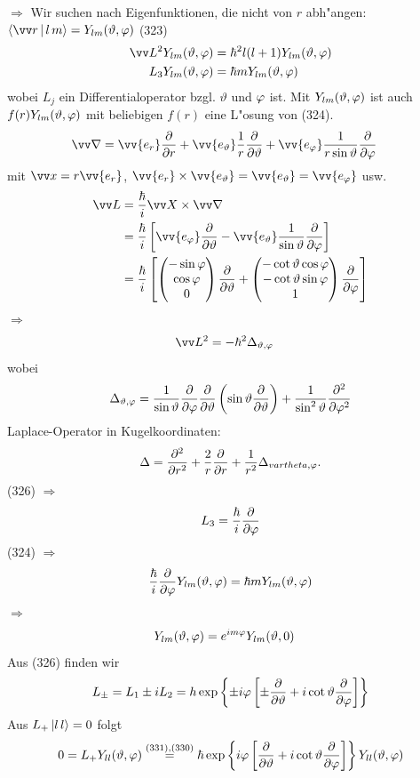 \documentclass[a4paper]{scrartcl}
\renewcommand{\phi}{\ensuremath \varphi}
\newcommand{\matr}[1]{\begin{pmatrix} #1 \end{pmatrix}}
\newcommand{\eqn}[1]{\begin{align} #1 \end{align}}
\newcommand{\spl}[1]{\begin{split} #1 \end{split}}
\begin{document}
{$\Longrightarrow$ Wir suchen nach Eigenfunktionen, die nicht von $r$ abh"angen: $\Braket{ \vv r | l \, m } = Y_{lm} ( \vartheta, \phi)$ \hfill (323)
\setcounter{equation}{323}
\eqn{ \spl{
\vv L^2 Y_{lm}(\vartheta, \phi) & = \hbar^2 l(l+1) Y_{lm}(\vartheta, \phi) \\
L_3 Y_{lm}(\vartheta, \phi) & = \hbar m Y_{lm}(\vartheta, \phi)
}}
wobei $L_j$ ein Differentialoperator bzgl. $\vartheta$ und $\phi$ ist. Mit $Y_{lm}( \vartheta, \phi)$ ist auch $f(r) Y_{lm}( \vartheta, \phi)$ mit beliebigen $f(r)$ eine L"osung von (324).
\eqn{ \vv \nabla & = \vv{e_r} \frac \partial {\partial r} + \vv{e_\vartheta} \frac1r \frac \partial {\partial \vartheta} + \vv{e_\phi} \frac1{r \sin \vartheta} \frac \partial {\partial \phi}}
mit $\vv x = r \vv{e_r}$, $\vv {e_r} \times \vv {e_\vartheta} = \vv{ e_\vartheta} = \vv{e_\phi}$ usw.
\eqn{
\spl{
\vv L & = \frac \hbar i \vv X \times \vv \nabla \\
& = \frac \hbar i \left[ \vv{ e_\phi} \frac \partial {\partial \vartheta} - \vv{e_\vartheta} \frac1{\sin \vartheta} \frac \partial {\partial \phi }\right] \\
& = \frac \hbar i \left[ \matr{ - \sin \phi \\ \cos \phi \\ 0 } \frac \partial {\partial \vartheta} + \matr{ - \cot \vartheta \cos \phi \\ - \cot \vartheta \sin \phi \\ 1 } \frac \partial {\partial \phi} \right]
}
}
$\Longrightarrow$
\eqn{ \vv L^2 & = - \hbar^2 \Delta_{\vartheta, \phi}}
wobei 
\eqn{ \Delta_{\vartheta, \phi} = \frac1{\sin \vartheta} \frac \partial {\partial \phi} \frac \partial {\partial \vartheta} \left( \sin \vartheta \frac \partial {\partial \vartheta} \right) + \frac1{\sin^2 \vartheta} \frac{\partial^2}{\partial \phi^2}}
Laplace-Operator in Kugelkoordinaten:
\eqn{ \Delta = \frac{\partial^2}{\partial r^2} + \frac2r \frac \partial {\partial r} + \frac1{r^2} \Delta_{vartheta, \phi}.}
(326) $\Longrightarrow$
$$L_3 = \frac \hbar i \frac \partial {\partial \phi}$$
(324) $\Longrightarrow$ 
$$\frac \hbar i \frac \partial {\partial \phi} Y_{lm}(\vartheta, \phi) = \hbar m Y_{lm} ( \vartheta, \phi)$$
$\Longrightarrow$
\eqn{Y_{lm} (\vartheta, \phi) & = e^{i m \phi} Y_{lm}(\vartheta, 0)}
Aus (326) finden wir
\eqn{ L_\pm = L_1 \pm i L_2 = h \exp \left\{\pm i \phi \left[ \pm \frac \partial{\partial \vartheta} + i \cot \vartheta \frac \partial {\partial \phi} \right] \right\}}
Aus $L_+ \Ket{ l  \, l } = 0$ folgt
\eqn{ \spl{
0 = L_+ Y_{ll}(\vartheta, \phi) & \stackrel{(331),(330)}= \hbar \exp \left\{ i \phi \left[ \frac \partial {\partial \vartheta} + i \cot \vartheta \frac \partial{\partial \phi} \right] \right\} Y_{ll}(\vartheta, \phi) \\
}}}
\end{document}
